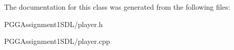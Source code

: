 The documentation for this class was generated from the following files\+:\begin{DoxyCompactItemize}
\item 
P\+G\+G\+Assignment1\+S\+D\+L/player.\+h\item 
P\+G\+G\+Assignment1\+S\+D\+L/player.\+cpp\end{DoxyCompactItemize}
